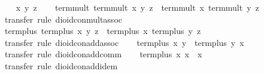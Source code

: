 \begin{isabellebody}
\ \ \isamarkupfalse%
\ x\ y\ z\isanewline
\ \ \isamarkupfalse%
\ {}term{}mult\ {}term{}mult\ x\ y{}\ z\ {}\ term{}mult\ x\ {}term{}mult\ y\ z{}{}\isanewline
\ \ \ \ \isamarkupfalse%
\ {}transfer{}\ rule\ dioid{}con{}mult{}assoc{}\isanewline
\ \ \isamarkupfalse%
\ {}term{}plus\ {}term{}plus\ x\ y{}\ z\ {}\ term{}plus\ x\ {}term{}plus\ y\ z{}{}\isanewline
\ \ \ \ \isamarkupfalse%
\ {}transfer{}\ rule\ dioid{}con{}add{}assoc{}\isanewline
\ \ \isamarkupfalse%
\ {}term{}plus\ x\ y\ {}\ term{}plus\ y\ x{}\isanewline
\ \ \ \ \isamarkupfalse%
\ {}transfer{}\ rule\ dioid{}con{}add{}comm{}\isanewline
\ \ \isamarkupfalse%
\ {}term{}plus\ x\ x\ {}\ x{}\isanewline
\ \ \ \ \isamarkupfalse%
\ {}transfer{}\ rule\ dioid{}con{}add{}idem{}\isanewline

\end{isabellebody}
